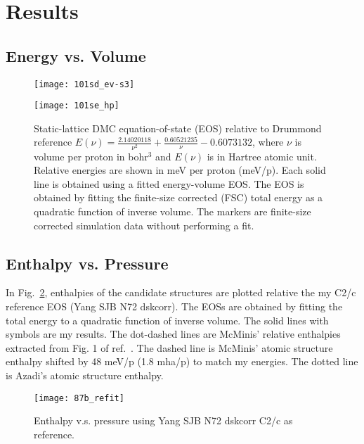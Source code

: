 \section{Results}

\subsection{Energy vs. Volume}
\begin{figure}[h]
\begin{minipage}{0.48\textwidth}
\texttt{[image: 101sd\_ev-s3]}
\end{minipage}
\begin{minipage}{0.48\textwidth}
\texttt{[image: 101se\_hp]}
\end{minipage}
\caption{Static-lattice DMC equation-of-state (EOS) relative to Drummond reference $E(\nu) = \frac{2.14020118}{\nu^2} + \frac{0.60521235}{\nu} - 0.6073132$, where $\nu$ is volume per proton in bohr$^3$ and $E(\nu)$ is in Hartree atomic unit. Relative energies are shown in meV per proton (meV/p). Each solid line is obtained using a fitted energy-volume EOS. The EOS is obtained by fitting the finite-size corrected (FSC) total energy as a quadratic function of inverse volume. The markers are finite-size corrected simulation data without performing a fit. \label{fig:static-qmc-vs-drummond}}
\end{figure}

\subsection{Enthalpy vs. Pressure}
In Fig.~\ref{fig:static-enthalpy-vs-pressure}, enthalpies of the candidate structures are plotted relative the my C2/c reference EOS (Yang SJB N72 dskcorr). The EOSs are obtained by fitting the total energy to a quadratic function of inverse volume. The solid lines with symbols are my results. The dot-dashed lines are McMinis' relative enthalpies extracted from Fig. 1 of ref.~\cite{McMinis2015}. The dashed line is McMinis' atomic structure enthalpy shifted by 48 meV/p (1.8 mha/p) to match my energies. The dotted line is Azadi's atomic structure enthalpy.

\begin{figure}[h]
\texttt{[image: 87b\_refit]}
\caption{Enthalpy v.s. pressure using Yang SJB N72 dskcorr C2/c as reference.\label{fig:static-enthalpy-vs-pressure}}
\end{figure}
